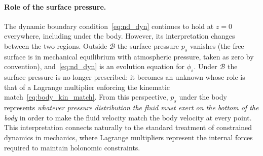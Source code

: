 \documentclass{article}
\begin{document}
\paragraph{Role of the surface pressure.}
The dynamic boundary condition~\eqref{eq:nd_dyn} continues to hold at $z = 0$ everywhere, including under the body.
However, its interpretation changes between the two regions.
Outside $\mathcal{B}$ the surface pressure $p_s$ vanishes (the free surface is in mechanical equilibrium with atmospheric pressure, taken as zero by convention), and~\eqref{eq:nd_dyn} is an evolution equation for $\phi_s$.
Under $\mathcal{B}$ the surface pressure is no longer prescribed: it becomes an unknown whose role is that of a Lagrange multiplier enforcing the kinematic match~\eqref{eq:body_kin_match}.
\color{blue}
From this perspective, $p_s$ under the body represents \emph{whatever pressure distribution the fluid must exert on the bottom of the body} in order to make the fluid velocity match the body velocity at every point.
This interpretation connects naturally to the standard treatment of constrained dynamics in mechanics, where Lagrange multipliers represent the internal forces required to maintain holonomic constraints.
\end{document}
